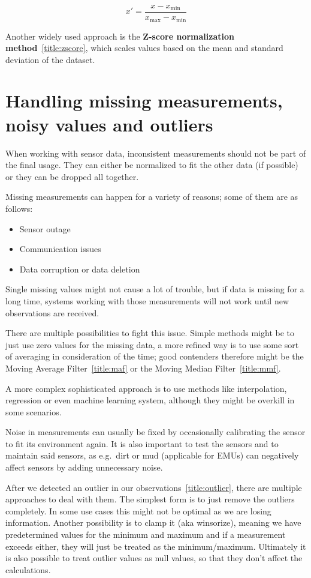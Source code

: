 \[
x' = \frac{x - x_{\min}}{x_{\max} - x_{\min}}
\]

Another widely used approach is the \textbf{Z-score normalization method}~\ref{title:zscore}, which scales values based on the mean and standard deviation of the dataset.\\
\noindent\cite{LRWeb:23, LRWeb:24}

\section{Handling missing measurements, noisy values and outliers}
When working with sensor data, inconsistent measurements should not be part of the final usage. They can either be normalized to fit the other data (if possible) or they can be dropped all together.

Missing measurements can happen for a variety of reasons; some of them are as follows:

\begin{itemize}
    \item Sensor outage
    \item Communication issues
    \item Data corruption or data deletion
\end{itemize}

Single missing values might not cause a lot of trouble, but if data is missing for a long time, systems working with those measurements will not work until new observations are received.

There are multiple possibilities to fight this issue. Simple methods might be to just use zero values for the missing data, a more refined way is to use some sort of averaging in consideration of the time; good contenders therefore might be the Moving Average Filter~\ref{title:maf} or the Moving Median Filter~\ref{title:mmf}.

A more complex sophisticated approach is to use methods like interpolation, regression or even machine learning system, although they might be overkill in some scenarios.

\noindent\cite{LRWeb:43}

Noise in measurements can usually be fixed by occasionally calibrating the sensor to fit its environment again. It is also important to test the sensors and to maintain said sensors, as e.g.\ dirt or mud (applicable for EMUs) can negatively affect sensors by adding unnecessary noise.

\noindent\cite{LRWeb:44}

After we detected an outlier in our observations~\ref{title:outlier}, there are multiple approaches to deal with them. The simplest form is to just remove the outliers completely. In some use cases this might not be optimal as we are losing information. Another possibility is to clamp it (aka winsorize), meaning we have predetermined values for the minimum and maximum and if a measurement exceeds either, they will just be treated as the minimum/maximum. Ultimately it is also possible to treat outlier values as null values, so that they don't affect the calculations.

\noindent\cite{LRWeb:42}